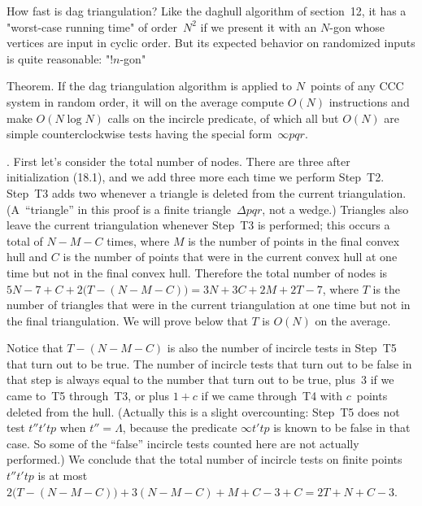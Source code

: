 How fast is dag triangulation? Like the daghull algorithm of
section~12, it has a "worst-case running time" of order~$N^2$ if we
present it with an $N$-gon whose vertices are input in cyclic order.
But its expected behavior on randomized inputs is quite reasonable:
"!$n$-gon"

\proclaim Theorem. If the dag triangulation algorithm is applied to\/
$N$~points of any CCC system in random order, it will on the average
compute\/ $O(N)$ instructions and make\/ $O(N\log N)$ calls on the incircle
predicate, of which all but\/ $O(N)$ are simple counterclockwise tests
having the special form\/~$\infty pqr$.

.\quad
First let's consider the total number of nodes. There are three after
initialization (18.1), and we add three more each time we perform Step~T2.
Step~T3 adds two whenever a triangle is deleted from the current
triangulation. (A~``triangle'' in this proof is a finite
triangle~$\Delta pqr$, not a wedge.) Triangles also leave the current
triangulation whenever Step~T3 is performed; this occurs a total of
$N-M-C$ times, where $M$ is the number of points in the final convex
hull and $C$ is the number of points that were in the current convex
hull at one time but not in the final convex hull. Therefore the total
number of nodes is $5N-7+C+2\bigl(T-(N-M-C)\bigr)=3N+3C+2M+2T-7$,
where $T$ is the number of triangles that were in the current
triangulation at one time but not in the final triangulation. We will
prove below that $T$ is $O(N)$ on the average.

Notice that $T-(N-M-C)$ is also the number of incircle tests in
Step~T5 that turn out to be true. The number of incircle tests that
turn out to be false in that step is always equal to the number that
turn out to be true, plus~3 if we came to~T5 through~T3, or plus $1+c$
if we came through~T4 with $c$~points deleted from the hull. (Actually
this is a slight overcounting: Step~T5 does not test $t''t'tp$
when $t''=\Lambda$, because the predicate $\infty t'tp$ is known to be
false in that case. So some of the ``false'' incircle tests counted
here are not actually performed.) We conclude that the total number of
incircle tests on finite points $t''t'tp$ is at most
$2\bigl(T-(N-M-C)\bigr)+3(N-M-C)+M+C-3+C=2T+N+C-3$.

